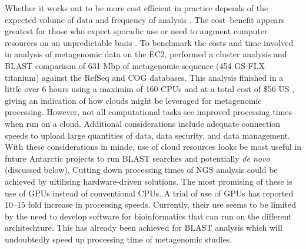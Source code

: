 Whether it works out to be more cost efficient in practice depends of the expected volume of data and frequency of analysis \cite{Wilkening2009}.
The cost--benefit appears greatest for those who expect sporadic use or need to augment computer resources on an unpredictable basis \cite{Wilkening2009}.
To benchmark the costs and time involved in analysis of metagenomic data on the \ac{EC2}, \citet{Angiuoli2011} performed a cluster analysis and \acs{BLAST} comparison of 631 Mbp of metagenomic sequence (454 GS FLX titanium) against the RefSeq and \acs{COG} databases.
This analysis finished in a little over 6 hours using a maximim of 160 \acs{CPU}s and at a total cost of \$56 US \cite{Angiuoli2011}, giving an indication of how clouds might be leveraged for metagenomic processing.
However, not all computational tasks see improved processing times when run on a cloud.
Additional considerations include adequate connection speeds to upload large quantities of data, data security, and data management.
With these considerations in minde, use of cloud resources looks be most useful in future Antarctic projects to run \acs{BLAST} searches and potentially \emph{de novo} (discussed below).
Cutting down processing times of \ac{NGS} analysis could be achieved by ultilising hardware-driven solutions.
The most promising of these is use of \acp{GPU} instead of conventional \acp{CPU}.
A trial of use of \acp{GPU} has reported 10--15 fold increase in processing speeds.
Currently, their use seems to be limited by the need to develop software for bioinformatics that can run on the different architechture.
This has already been achieved for \acs{BLAST} analysis which will undoubtedly speed up processing time of metagenomic studies.

